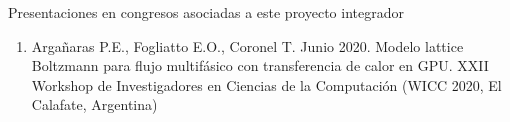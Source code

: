 \documentclass[12pt,papel,oneside]{ibtesis}
\begin{document}






\appendix
%
%

%
%
%
%

\begin{seccion}{Presentaciones en congresos asociadas a este proyecto integrador}
	
	\begin{enumerate}
		
		\item Argañaras P.E., Fogliatto E.O., Coronel T. Junio 2020. Modelo lattice Boltzmann para flujo multifásico con transferencia de calor en GPU. XXII Workshop de Investigadores en Ciencias de la Computación (WICC 2020, El Calafate, Argentina)
		
	\end{enumerate}
	
\end{seccion}


\begin{biblio}

\end{biblio}
\end{document}
